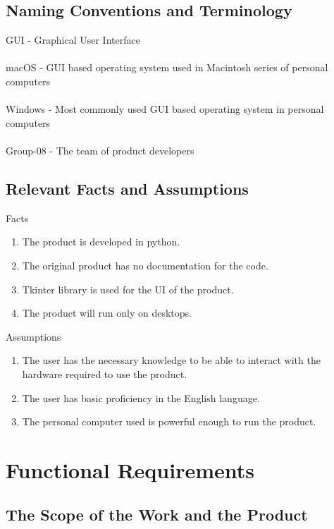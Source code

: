 \documentclass[12pt, titlepage]{article}
\begin{document}
\subsection{Naming Conventions and Terminology}

GUI - Graphical User Interface\\
\\
macOS - GUI based operating system used in Macintosh series of personal computers\\
\\
Windows - Most commonly used GUI based operating system in personal computers\\
\\
Group-08 - The team of product developers\\

\subsection{Relevant Facts and Assumptions}

Facts
\begin{enumerate}
	\item The product is developed in python.
	\item The original product has no documentation for the code.
	\item Tkinter library is used for the UI of the product. 
	\item The product will run only on desktops.
\end{enumerate}

\noindent Assumptions
\begin{enumerate}
	\item The user has the necessary knowledge to be able to interact with the hardware required to use the product.
	\item The user has basic proficiency in the English language.
	\item The personal computer used is powerful enough to run the product.
\end{enumerate}

\section{Functional Requirements}

\subsection{The Scope of the Work and the Product}
\end{document}

